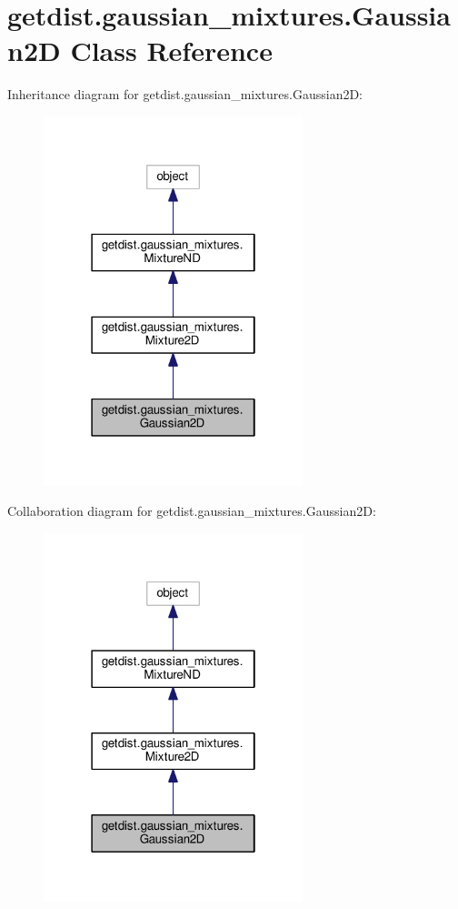 \hypertarget{classgetdist_1_1gaussian__mixtures_1_1Gaussian2D}{}\section{getdist.\+gaussian\+\_\+mixtures.\+Gaussian2D Class Reference}
\label{classgetdist_1_1gaussian__mixtures_1_1Gaussian2D}


Inheritance diagram for getdist.\+gaussian\+\_\+mixtures.\+Gaussian2D\+:
\nopagebreak
\begin{figure}[H]
\begin{center}
\leavevmode
\includegraphics[width=214pt]{classgetdist_1_1gaussian__mixtures_1_1Gaussian2D__inherit__graph}
\end{center}
\end{figure}


Collaboration diagram for getdist.\+gaussian\+\_\+mixtures.\+Gaussian2D\+:
\nopagebreak
\begin{figure}[H]
\begin{center}
\leavevmode
\includegraphics[width=214pt]{classgetdist_1_1gaussian__mixtures_1_1Gaussian2D__coll__graph}
\end{center}
\end{figure}
